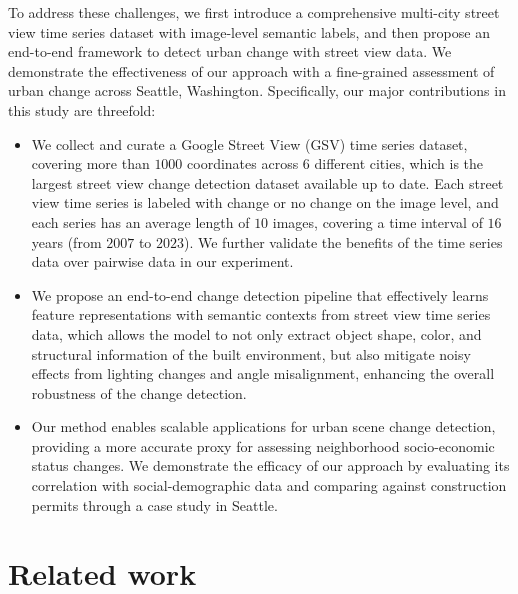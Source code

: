 \documentclass[letterpaper]{article} %
\begin{document}
To address these challenges, we first introduce a comprehensive multi-city street view time series dataset with image-level semantic labels, and then propose an end-to-end framework to detect urban change with street view data. We demonstrate the effectiveness of our approach with a fine-grained assessment of urban change across Seattle, Washington. Specifically, our major contributions in this study are threefold: 
\begin{itemize}
    \item We collect and curate a Google Street View (GSV) time series dataset, covering more than $1000$ coordinates across $6$ different cities, which is the largest street view change detection dataset available up to date. Each street view time series is labeled with change or no change on the image level, and each series has an average length of $10$ images, covering a time interval of $16$ years (from $2007$ to $2023$). We further validate the benefits of the time series data over pairwise data in our experiment.
    \item We propose an end-to-end change detection pipeline that effectively learns feature representations with semantic contexts from street view time series data, which allows the model to not only extract object shape, color, and structural information of the built environment, but also mitigate noisy effects from lighting changes and angle misalignment, enhancing the overall robustness of the change detection.
    \item Our method enables scalable applications for urban scene change detection, providing a more accurate proxy for assessing neighborhood socio-economic status changes. We demonstrate the efficacy of our approach by evaluating its correlation with social-demographic data and comparing against construction permits through a case study in Seattle.
\end{itemize}

\section{Related work}
\end{document}
